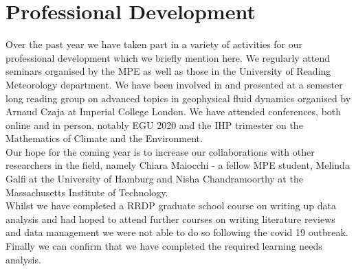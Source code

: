 \section{Professional Development}

Over the past year we have taken part in a variety of activities for our professional development which we briefly mention here. We regularly attend seminars organised by the MPE as well as those in the University of Reading Meteorology department. We have been involved in and presented at a semester long reading group on advanced topics in geophysical fluid dynamics organised by Arnaud Czaja at Imperial College London. We have attended conferences, both online and in person, notably EGU 2020 and the IHP trimester on the Mathematics of Climate and the Environment.\\

Our hope for the coming year is to increase our collaborations with other researchers in the field, namely Chiara Maiocchi - a fellow MPE student, Melinda Galfi at the University of Hamburg and Nisha Chandramoorthy at the Massachusetts Institute of Technology.\\

Whilst we have completed a RRDP graduate school course on writing up data analysis and had hoped to attend further courses on writing literature reviews and data management we were not able to do so following the covid 19 outbreak. Finally we can confirm that we have completed the required learning needs analysis.
